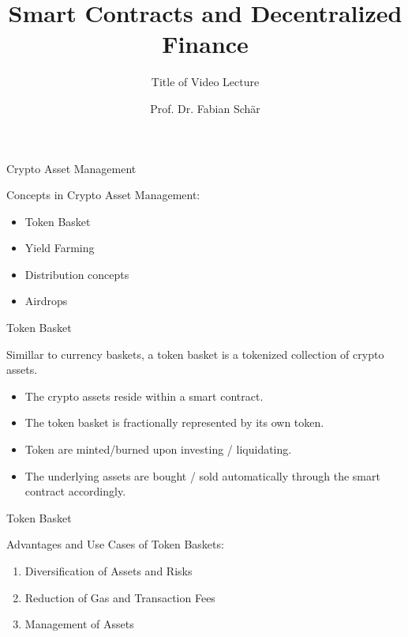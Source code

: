 \documentclass[handout]{beamer}
\title{Smart Contracts and Decentralized Finance}
\subtitle{Title of Video Lecture}
\author{Prof. Dr. Fabian Schär}
\institute{University of Basel}
\begin{document}
\thispagestyle{empty}
\begin{frame}[noframenumbering]
	\titlepage
\end{frame}


\begin{frame}{Crypto Asset Management}

Concepts in Crypto Asset Management: \\ \vspace{1em}
	
	\begin{itemize}
		\item<1-> Token Basket 
		\item<2-> Yield Farming
		\item<3-> Distribution concepts
		\item<4-> Airdrops
	\end{itemize}

\end{frame}

\begin{frame}{Token Basket}

Simillar to currency baskets, a token basket is a tokenized collection of crypto assets.\\ \vspace{1em}


	\begin{itemize}
		\item<1-> The crypto assets reside within a smart contract.
		\item<2-> The token basket is fractionally represented by its own token.
		\item<3-> Token are minted/burned upon investing / liquidating.
		\item<3-> The underlying assets are bought / sold automatically  through the smart contract accordingly.
	\end{itemize}
	
\end{frame}


\begin{frame}{Token Basket}

Advantages and Use Cases of Token Baskets:\\ \vspace{1em}

	\begin{enumerate}
		\item<1-> Diversification of Assets and Risks
		\item<2-> Reduction of Gas and Transaction Fees
		\item<3-> Management of Assets
	\end{enumerate}
	
\end{frame}
\end{document}
